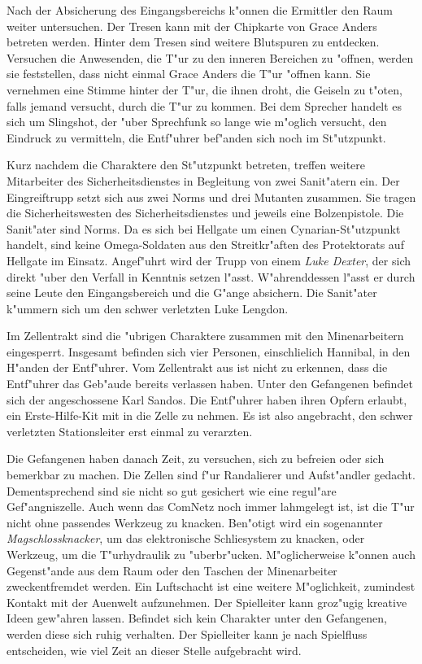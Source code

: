 
Nach der Absicherung des Eingangsbereichs k"onnen die Ermittler den Raum weiter untersuchen. Der Tresen kann mit der Chipkarte von Grace Anders betreten werden. Hinter dem Tresen sind weitere Blutspuren zu entdecken. Versuchen die Anwesenden, die T"ur zu den inneren Bereichen zu "offnen, werden sie feststellen, dass nicht einmal Grace Anders die T"ur "offnen kann. Sie vernehmen eine Stimme hinter der T"ur, die ihnen droht, die Geiseln zu t"oten, falls jemand versucht, durch die T"ur zu kommen. Bei dem Sprecher handelt es sich um Slingshot, der "uber Sprechfunk so lange wie m"oglich versucht, den Eindruck zu vermitteln, die Entf"uhrer bef"anden sich noch im St"utzpunkt.

Kurz nachdem die Charaktere den St"utzpunkt betreten, treffen weitere Mitarbeiter des Sicherheitsdienstes in Begleitung von zwei Sanit"atern ein. Der Eingreiftrupp setzt sich aus zwei Norms und drei Mutanten zusammen. Sie tragen die Sicherheitswesten des Sicherheitsdienstes und jeweils eine Bolzenpistole. Die Sanit"ater sind Norms. Da es sich bei Hellgate um einen Cynarian-St"utzpunkt handelt, sind keine Omega-Soldaten aus den Streitkr"aften des Protektorats auf Hellgate im Einsatz. Angef"uhrt wird der Trupp von einem \emph{Luke Dexter}, der sich direkt "uber den Verfall in Kenntnis setzen l"asst. W"ahrenddessen l"asst er durch seine Leute den Eingangsbereich und die G"ange absichern. Die Sanit"ater k"ummern sich um den schwer verletzten Luke Lengdon.


Im Zellentrakt sind die "ubrigen Charaktere zusammen mit den Minenarbeitern eingesperrt. Insgesamt befinden sich vier Personen, einschlie\3lich Hannibal, in den H"anden der Entf"uhrer. Vom Zellentrakt aus ist nicht zu erkennen, dass die Entf"uhrer das Geb"aude bereits verlassen haben. Unter den Gefangenen befindet sich der angeschossene Karl Sandos. Die Entf"uhrer haben ihren Opfern erlaubt, ein Erste-Hilfe-Kit mit in die Zelle zu nehmen. Es ist also angebracht, den schwer verletzten Stationsleiter erst einmal zu verarzten. 

Die Gefangenen haben danach Zeit, zu versuchen, sich zu befreien oder sich bemerkbar zu machen. Die Zellen sind f"ur Randalierer und Aufst"andler gedacht. Dementsprechend sind sie nicht so gut gesichert wie eine regul"are Gef"angniszelle. Auch wenn das ComNetz noch immer lahmgelegt ist, ist die T"ur nicht ohne passendes Werkzeug zu knacken. Ben"otigt wird ein sogenannter \emph{Magschlossknacker}, um das elektronische Schlie\3system zu knacken, oder Werkzeug, um die T"urhydraulik zu "uberbr"ucken. M"oglicherweise k"onnen auch Gegenst"ande aus dem Raum oder den Taschen der Minenarbeiter zweckentfremdet werden. Ein Luftschacht ist eine weitere M"oglichkeit, zumindest Kontakt mit der Au\3enwelt aufzunehmen. Der Spielleiter kann gro\3z"ugig kreative Ideen gew"ahren lassen. Befindet sich kein Charakter unter den Gefangenen, werden diese sich ruhig verhalten. Der Spielleiter kann je nach Spielfluss entscheiden, wie viel Zeit an dieser Stelle aufgebracht wird.

